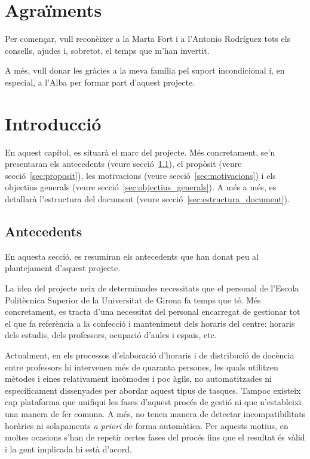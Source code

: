 \documentclass[a4paper,12pt]{ThesisStyle}
\begin{document}
\let\cleardoublepage\clearpage
{}
\frontmatter
\dominitoc

\chapter*{Agraïments}
\label{cap:agraiments}

Per començar, vull reconèixer a la Marta Fort i a l'Antonio Rodríguez tots els consells, ajudes i, sobretot, el temps que m'han invertit.

A més, vull donar les gràcies a la meva família pel suport incondicional i, en especial, a l'Alba per formar part d'aquest projecte.


\tableofcontents
\listoffigures
\listoftables

\mainmatter

\chapter{Introducció}
\label{cap:intro}

En aquest capítol, es situarà el marc del projecte. Més concretament, se'n presentaran els antecedents (veure secció~\ref{sec:antecedents}), el propòsit (veure secció~\ref{sec:proposit}), les motivacions (veure secció~\ref{sec:motivacions}) i els objectius generals (veure secció~\ref{sec:objectius_generals}). A més a més, es detallarà l'estructura del document (veure secció~\ref{sec:estructura_document}).

\section{Antecedents}
\label{sec:antecedents}

En aquesta secció, es resumiran els antecedents que han donat peu al plantejament d'aquest projecte.

La idea del projecte neix de determinades necessitats que el personal de l'Escola Politècnica Superior de la Universitat de Girona fa temps que té. Més concretament, es tracta d'una necessitat del personal encarregat de gestionar tot el que fa referència a la confecció i manteniment dels horaris del centre: horaris dels estudis, dels professors, ocupació d'aules i espais, etc.

Actualment, en els processos d'elaboració d'horaris i de distribució de docència entre professors hi intervenen més de quaranta persones, les quals utilitzen mètodes i eines relativament incòmodes i poc àgils, no automatitzades ni específicament dissenyades per abordar aquest tipus de tasques. Tampoc existeix cap plataforma que unifiqui les fases d'aquest procés de gestió ni que n'estableixi una manera de fer comuna. A més, no tenen manera de detectar incompatibilitats horàries ni solapaments \textit{a priori} de forma automàtica. Per aquests motius, en moltes ocasions s'han de repetir certes fases del procés fins que el resultat és vàlid i la gent implicada hi està d'acord.
\end{document}
